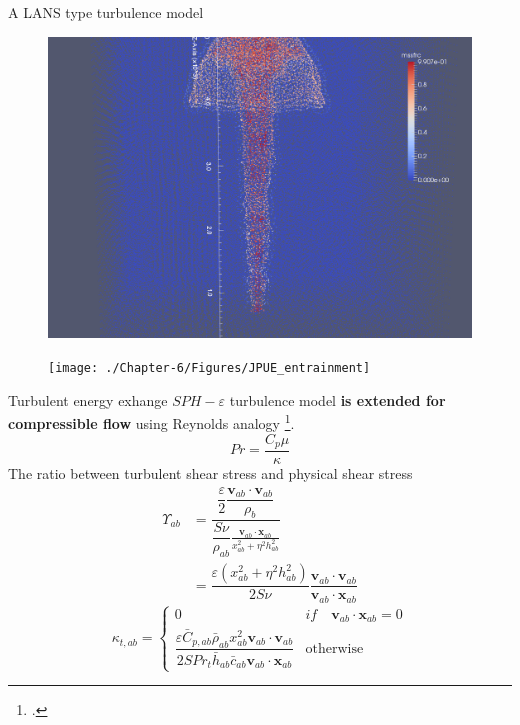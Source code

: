 \documentclass{beamer}
\begin{document}
\begin{frame}{A LANS type turbulence model}
\begin{minipage}{0.34 \textwidth}
\begin{figure}
\includegraphics[width=0.80 \textwidth]{./PPT/No_turb}
\end{figure}
%
\begin{figure}
\texttt{[image: ./Chapter-6/Figures/JPUE\_entrainment]}
\end{figure}
\end{minipage}
\end{frame}

\begin{frame}{Turbulent energy exhange}
$SPH-\varepsilon$ turbulence model \textbf{is extended for compressible flow} using Reynolds analogy \footcite{gmd-2017-119}.
\begin{equation}
Pr=\dfrac{C_p \mu}{\kappa}
\end{equation}
The ratio between turbulent shear stress and physical shear stress %
\begin{equation}
\begin{split}
\Upsilon_{ab} &= \dfrac{\dfrac{\varepsilon}{2} \dfrac{\textbf{v}_{ab} \cdot \textbf{v}_{ab}}{\rho_b}}{\dfrac{S \nu}{\rho_{ab}} \frac{\textbf{v}_{ab} \cdot \textbf{x}_{ab}}{x_{ab}^2 + \eta^2 h_{ab}^2}} \\
 & = \dfrac{\varepsilon \left(x_{ab}^2 + \eta^2 h_{ab}^2\right)}{2 S \nu} \dfrac{\textbf{v}_{ab} \cdot \textbf{v}_{ab}}{\textbf{v}_{ab} \cdot \textbf{x}_{ab}}
\end{split}
\end{equation}
\begin{equation}
\kappa_{t,ab}= 
\begin{cases} 
      0 & if \quad \textbf{v}_{ab} \cdot \textbf{x}_{ab} = 0 \\
      \dfrac{\varepsilon \bar{C}_{p,ab} \bar{\rho}_{ab} x_{ab}^2 \textbf{v}_{ab} \cdot \textbf{v}_{ab}}{2 S Pr_t \bar{h}_{ab} \bar{c}_{ab} \textbf{v}_{ab} \cdot \textbf{x}_{ab} } & \text{otherwise}
\end{cases}
\label{eq:SPH-LANS-heat-conductivity}
\end{equation}
\end{frame}
\end{document}
